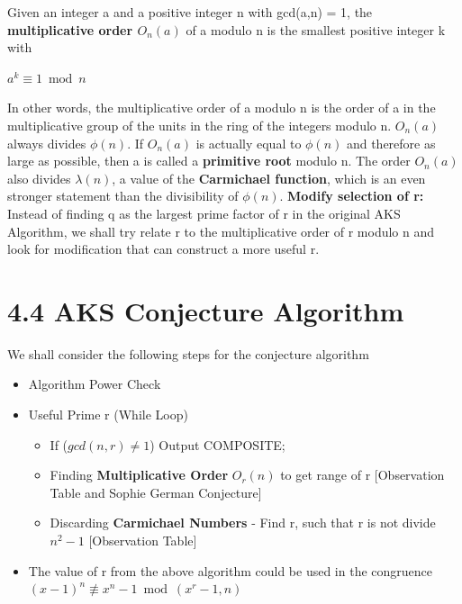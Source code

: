 \documentclass[a4paper,12pt]{article}
\begin{document}
\begin{flushleft}
	Given an integer a and a positive integer n with gcd(a,n) = 1, the \textbf{multiplicative order \(O_{n}(a)\)} of a modulo n is the smallest positive integer k with \begin{center}
		\(a^k \equiv 1 \bmod n \)
	\end{center}
	
	In other words, the multiplicative order of a modulo n is the order of a in the multiplicative group of the units in the ring of the integers modulo n.
	\vspace{0.1in} 
	\newline
	\(O_{n}(a)\) always divides \(\phi(n)\). If \(O_{n}(a)\) is actually equal to \(\phi(n)\) and therefore as large as possible, then a is called a \textbf{primitive root} modulo n.
	\vspace{0.1in} 
	\newline
	The order \(O_{n}(a)\) also divides \(\lambda(n)\), a value of the \textbf{Carmichael function}, which is an even stronger statement than the divisibility of \(\phi(n)\).
	\vspace{0.1in} 
	\newline
	\textbf{Modify selection of r:} Instead of finding q as the largest prime factor of r in the original AKS Algorithm, we shall try relate r to the multiplicative order of r modulo n and look for modification that can construct a more useful r.
\end{flushleft}

\newpage
{}
\section*{\large 4.4 AKS Conjecture Algorithm}

We shall consider the following steps for the conjecture algorithm

\begin{flushleft}
	\begin{itemize}
		\setlength{\itemindent}{.2in}
		\item Algorithm Power Check 
		\item Useful Prime r (While Loop)
		\begin{itemize}
				\setlength{\itemindent}{.2in}
				\item If (\(gcd(n,r) \neq 1\)) Output COMPOSITE;
				\item Finding \textbf{Multiplicative Order} \(O_{r}(n)\) to get range of r [Observation Table and Sophie German Conjecture]
				\item Discarding \textbf{Carmichael Numbers} - Find r, such that r is not divide \(n^2 - 1\) [Observation Table]
		\end{itemize}
		\item The value of r from the above algorithm could be used in the congruence \((x-1)^n \not\equiv x^n - 1 \bmod (x^r-1,n)\)
	\end{itemize}
\end{flushleft}
\end{document}
